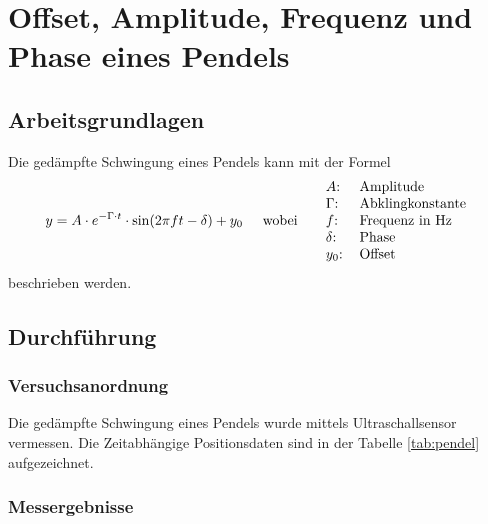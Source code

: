 \section{Offset, Amplitude, Frequenz und Phase eines Pendels}

\subsection{Arbeitsgrundlagen}

Die ged\"ampfte Schwingung eines Pendels kann mit der Formel
\begin{equation}
    y = A \cdot e^{-\Gamma \cdot t} \cdot \sin(2\pi f t - \delta) + y_0
    \hspace{5mm} \textrm{wobei} \hspace{5mm}
    \begin{tabular}{ll}
        $A$:        & Amplitude \\
        $\Gamma$:   & Abklingkonstante \\
        $f$:        & Frequenz in Hz \\
        $\delta$:   & Phase \\
        $y_0$:      & Offset \\
    \end{tabular}
    \label{eq:gedaempfte-schwingung}
\end{equation}
beschrieben werden.


\subsection{Durchf\"uhrung}

\subsubsection*{Versuchsanordnung}

Die ged\"ampfte Schwingung eines Pendels wurde mittels Ultraschallsensor vermessen. Die Zeitabh\"angige
Positionsdaten sind in der Tabelle \ref{tab:pendel} aufgezeichnet.


\subsubsection*{Messergebnisse}

